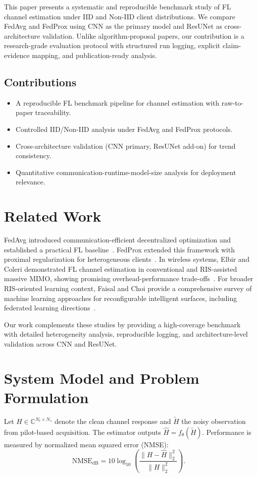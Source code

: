 \documentclass[onecolumn]{IEEEtran}
\begin{document}
This paper presents a systematic and reproducible benchmark study of FL channel estimation under IID and Non-IID client distributions. We compare FedAvg and FedProx using CNN as the primary model and ResUNet as cross-architecture validation. Unlike algorithm-proposal papers, our contribution is a research-grade evaluation protocol with structured run logging, explicit claim-evidence mapping, and publication-ready analysis.

\subsection{Contributions}
\begin{itemize}
    \item A reproducible FL benchmark pipeline for channel estimation with raw-to-paper traceability.
    \item Controlled IID/Non-IID analysis under FedAvg and FedProx protocols.
    \item Cross-architecture validation (CNN primary, ResUNet add-on) for trend consistency.
    \item Quantitative communication-runtime-model-size analysis for deployment relevance.
\end{itemize}

\section{Related Work}
FedAvg introduced communication-efficient decentralized optimization and established a practical FL baseline~\cite{mcmahan2017fedavg}. FedProx extended this framework with proximal regularization for heterogeneous clients~\cite{li2020fedprox}. In wireless systems, Elbir and Coleri demonstrated FL channel estimation in conventional and RIS-assisted massive MIMO, showing promising overhead-performance trade-offs~\cite{elbir2021flchannel}. For broader RIS-oriented learning context, Faisal and Choi provide a comprehensive survey of machine learning approaches for reconfigurable intelligent surfaces, including federated learning directions~\cite{faisal2022rismlsurvey}. 

Our work complements these studies by providing a high-coverage benchmark with detailed heterogeneity analysis, reproducible logging, and architecture-level validation across CNN and ResUNet.

\section{System Model and Problem Formulation}
Let $H\in\mathbb{C}^{N_t\times N_s}$ denote the clean channel response and $\tilde H$ the noisy observation from pilot-based acquisition. The estimator outputs $\hat H=f_\theta(\tilde H)$. Performance is measured by normalized mean squared error (NMSE):
\begin{equation}
\mathrm{NMSE}_{\mathrm{dB}} = 10\log_{10}\left(\frac{\|H-\hat H\|_2^2}{\|H\|_2^2}\right).
\end{equation}
\end{document}
